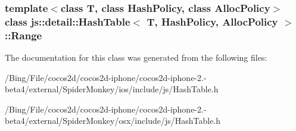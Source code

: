 \subsubsection*{template$<$class T, class Hash\-Policy, class Alloc\-Policy$>$ class js\-::detail\-::\-Hash\-Table$<$ T, Hash\-Policy, Alloc\-Policy $>$\-::\-Range}



The documentation for this class was generated from the following files\-:\begin{DoxyCompactItemize}
\item 
/\-Bing/\-File/cocos2d/cocos2d-\/iphone/cocos2d-\/iphone-\/2.-\/beta4/external/\-Spider\-Monkey/ios/include/js/Hash\-Table.\-h\item 
/\-Bing/\-File/cocos2d/cocos2d-\/iphone/cocos2d-\/iphone-\/2.-\/beta4/external/\-Spider\-Monkey/osx/include/js/Hash\-Table.\-h\end{DoxyCompactItemize}
